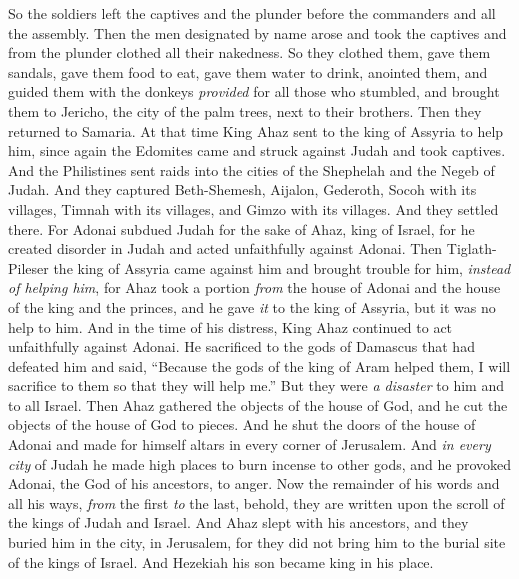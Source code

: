 \begin{biblechapter}
\verse So the soldiers left the captives and the plunder before the commanders and all the assembly.
\verse Then the men designated by name arose and took the captives and from the plunder clothed all their nakedness. So they clothed them, gave them sandals, gave them food to eat, gave them water to drink, anointed them, and guided them with the donkeys \textit{provided} for all those who stumbled, and brought them to Jericho, the city of the palm trees, next to their brothers. Then they returned to Samaria.
\verse At that time King Ahaz sent to the king of Assyria to help him,
\verse since again the Edomites came and struck against Judah and took captives.
\verse And the Philistines sent raids into the cities of the Shephelah and the Negeb of Judah. And they captured Beth-Shemesh, Aijalon, Gederoth, Socoh with its villages, Timnah with its villages, and Gimzo with its villages. And they settled there.
\verse For Adonai subdued Judah for the sake of Ahaz, king of Israel, for he created disorder in Judah and acted unfaithfully against Adonai.
\verse Then Tiglath-Pileser the king of Assyria came against him and brought trouble for him, \textit{instead of helping him},
\verse for Ahaz took a portion \textit{from} the house of Adonai and the house of the king and the princes, and he gave \textit{it} to the king of Assyria, but it was no help to him.
\verse And in the time of his distress, King Ahaz continued to act unfaithfully against Adonai.
\verse He sacrificed to the gods of Damascus that had defeated him and said, “Because the gods of the king of Aram helped them, I will sacrifice to them so that they will help me.” But they were \textit{a disaster} to him and to all Israel.
\verse Then Ahaz gathered the objects of the house of God, and he cut the objects of the house of God to pieces. And he shut the doors of the house of Adonai and made for himself altars in every corner of Jerusalem.
\verse And \textit{in every city} of Judah he made high places to burn incense to other gods, and he provoked Adonai, the God of his ancestors, to anger.
\verse Now the remainder of his words and all his ways, \textit{from} the first \textit{to} the last, behold, they are written upon the scroll of the kings of Judah and Israel.
\verse And Ahaz slept with his ancestors, and they buried him in the city, in Jerusalem, for they did not bring him to the burial site of the kings of Israel. And Hezekiah his son became king in his place.
\end{biblechapter}

